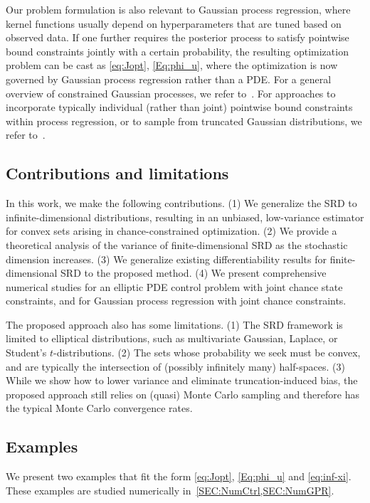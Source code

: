 \documentclass[%
onefignum,onetabnum]{siamonline250211}
\begin{document}
Our problem formulation is also relevant to Gaussian process regression, where kernel functions usually depend on hyperparameters that are tuned based on observed data. If one further requires the posterior process to satisfy pointwise bound constraints jointly with a certain probability, the resulting optimization problem can be cast as \eqref{eq:Jopt}, \eqref{Eq:phi_u}, where the optimization is now governed by Gaussian process regression rather than a PDE. For a general overview of constrained Gaussian processes, we refer to~\cite{SwGuFrSaJa-JMLMC20}. For approaches to incorporate typically individual (rather than joint) pointwise bound constraints within process regression, or to sample from truncated Gaussian distributions, we refer to~\cite{PeYaZh-TAML20, KoYa-25, VeMa-12}.

\subsection{Contributions and limitations}
In this work, we make the following contributions.
%
(1) We generalize the SRD to infinite-dimensional distributions, resulting in an unbiased, low-variance estimator for convex sets arising in chance-constrained optimization.
%
(2) We provide a theoretical analysis of the variance of finite-dimensional SRD as the stochastic dimension increases.
%
(3) We generalize existing differentiability results for finite-dimensional SRD to the proposed method.
%
(4) We present comprehensive numerical studies for an elliptic PDE control problem with joint chance state constraints, and for Gaussian process regression with joint chance constraints.
%

The proposed approach also has some limitations.
%
(1) The SRD framework is limited to elliptical distributions, such as multivariate Gaussian, Laplace, or Student's $t$-distributions.
%
(2) The sets whose probability we seek must be convex, and are typically the intersection of (possibly infinitely many) half-spaces.
%
(3) While we show how to lower variance and eliminate truncation-induced bias, the proposed approach still relies on (quasi) Monte Carlo sampling and therefore has the typical Monte Carlo convergence rates.

\subsection{Examples}\label{sec:intro-examples}
We present two examples that fit the form \eqref{eq:Jopt}, \eqref{Eq:phi_u} and \eqref{eq:inf-xi}. These examples are studied numerically in~\cref{SEC:NumCtrl,SEC:NumGPR}.
\end{document}
